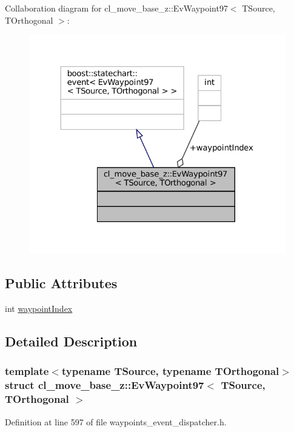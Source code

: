 Collaboration diagram for cl\+\_\+move\+\_\+base\+\_\+z\+:\+:Ev\+Waypoint97$<$ T\+Source, T\+Orthogonal $>$\+:
\nopagebreak
\begin{figure}[H]
\begin{center}
\leavevmode
\includegraphics[width=324pt]{structcl__move__base__z_1_1EvWaypoint97__coll__graph}
\end{center}
\end{figure}
\subsection*{Public Attributes}
\begin{DoxyCompactItemize}
\item 
int \hyperlink{structcl__move__base__z_1_1EvWaypoint97_ae2a955466fb13db1df4cfa79f0df9c5e}{waypoint\+Index}
\end{DoxyCompactItemize}


\subsection{Detailed Description}
\subsubsection*{template$<$typename T\+Source, typename T\+Orthogonal$>$\newline
struct cl\+\_\+move\+\_\+base\+\_\+z\+::\+Ev\+Waypoint97$<$ T\+Source, T\+Orthogonal $>$}



Definition at line 597 of file waypoints\+\_\+event\+\_\+dispatcher.\+h.



